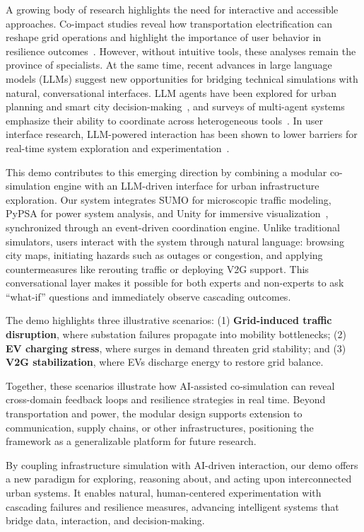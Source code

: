 \documentclass[sigconf,anonymous,review]{acmart}
\begin{document}
A growing body of research highlights the need for interactive and accessible approaches. Co-impact studies reveal how transportation electrification can reshape grid operations and highlight the importance of user behavior in resilience outcomes~\cite{xu2020coimpact}. However, without intuitive tools, these analyses remain the province of specialists. At the same time, recent advances in large language models (LLMs) suggest new opportunities for bridging technical simulations with natural, conversational interfaces. LLM agents have been explored for urban planning and smart city decision-making~\cite{kalyuzhnaya2025llm, han2025large}, and surveys of multi-agent systems emphasize their ability to coordinate across heterogeneous tools~\cite{guo2024large}. In user interface research, LLM-powered interaction has been shown to lower barriers for real-time system exploration and experimentation~\cite{pozdniakov2024large}.

This demo contributes to this emerging direction by combining a modular co-simulation engine with an LLM-driven interface for urban infrastructure exploration. Our system integrates SUMO for microscopic traffic modeling, PyPSA for power system analysis, and Unity for immersive visualization~\cite{unity2023}, synchronized through an event-driven coordination engine. Unlike traditional simulators, users interact with the system through natural language: browsing city maps, initiating hazards such as outages or congestion, and applying countermeasures like rerouting traffic or deploying V2G support. This conversational layer makes it possible for both experts and non-experts to ask “what-if” questions and immediately observe cascading outcomes.

The demo highlights three illustrative scenarios:
(1) \textbf{Grid-induced traffic disruption}, where substation failures propagate into mobility bottlenecks; (2) \textbf{EV charging stress}, where surges in demand threaten grid stability; and (3) \textbf{V2G stabilization}, where EVs discharge energy to restore grid balance.

Together, these scenarios illustrate how AI-assisted co-simulation can reveal cross-domain feedback loops and resilience strategies in real time. Beyond transportation and power, the modular design supports extension to communication, supply chains, or other infrastructures, positioning the framework as a generalizable platform for future research.

By coupling infrastructure simulation with AI-driven interaction, our demo offers a new paradigm for exploring, reasoning about, and acting upon interconnected urban systems. It enables natural, human-centered experimentation with cascading failures and resilience measures, advancing intelligent systems that bridge data, interaction, and decision-making.
\end{document}
